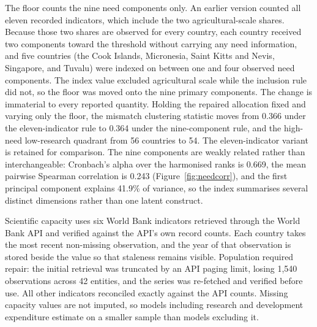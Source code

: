 \documentclass[ASNA,twocolumn]{USG}
\begin{document}
The floor counts the nine need components only. An earlier version counted all eleven recorded
indicators, which include the two agricultural-scale shares. Because those two shares are observed
for every country, each country received two components toward the threshold without carrying any
need information, and five countries (the Cook Islands, Micronesia, Saint Kitts and Nevis,
Singapore, and Tuvalu) were indexed on between one and four observed need components. The index
value excluded agricultural scale while the inclusion rule did not, so the floor was moved onto
the nine primary components. The change is immaterial to every reported quantity. Holding the repaired allocation fixed and
varying only the floor, the mismatch clustering statistic moves from 0.366 under the
eleven-indicator rule to 0.364 under the nine-component rule, and the high-need low-research
quadrant from 56 countries to 54. The eleven-indicator variant is retained for comparison. The nine components are weakly related rather than
interchangeable: Cronbach's alpha over the harmonised ranks is 0.669, the mean pairwise Spearman correlation is 0.243 (Figure~\ref{fig:needcorr}), and the first
principal component explains 41.9\% of variance, so the index
summarises several distinct dimensions rather than one latent construct.


Scientific capacity uses six World Bank indicators retrieved through the World Bank API and
verified against the API's own record counts. Each country takes the most recent non-missing
observation, and the year of that observation is stored beside the value so that staleness
remains visible. Population required repair: the initial retrieval was truncated by an API
paging limit, losing 1,540 observations across 42 entities, and the series was re-fetched and
verified before use. All other indicators reconciled exactly against the API counts. Missing
capacity values are not imputed, so models including research and development expenditure
estimate on a smaller sample than models excluding it.

\end{document}
